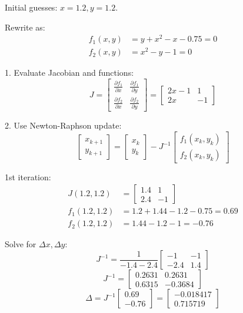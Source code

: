 \documentclass{article}
\begin{document}
Initial guesses: \( x = 1.2, y = 1.2 \).

Rewrite as:
\begin{align*}
f_1(x, y) &= y + x^2 - x - 0.75 = 0 \\
f_2(x, y) &= x^2 - y - 1 = 0
\end{align*}

1. Evaluate Jacobian and functions:
   \[
   J = \begin{bmatrix}
   \frac{\partial f_1}{\partial x} & \frac{\partial f_1}{\partial y} \\
   \frac{\partial f_2}{\partial x} & \frac{\partial f_2}{\partial y}
   \end{bmatrix}
   =
   \begin{bmatrix}
   2x - 1 & 1 \\
   2x & -1
   \end{bmatrix}
   \]

2. Use Newton-Raphson update:
   \[
   \begin{bmatrix} x_{k+1} \\ y_{k+1} \end{bmatrix} = \begin{bmatrix} x_k \\ y_k \end{bmatrix} - J^{-1} \begin{bmatrix} f_1(x_k, y_k) \\ f_2(x_k, y_k) \end{bmatrix}
   \]

1st iteration:
\begin{align*}
J(1.2, 1.2) &= \begin{bmatrix} 1.4 & 1 \\ 2.4 & -1 \end{bmatrix} \\
f_1(1.2, 1.2) &= 1.2 + 1.44 - 1.2 - 0.75 = 0.69 \\
f_2(1.2, 1.2) &= 1.44 - 1.2 - 1 = -0.76
\end{align*}

Solve for \( \Delta x, \Delta y \):
\[
J^{-1} = \frac{1}{-1.4 - 2.4} \begin{bmatrix} -1 & -1 \\ -2.4 & 1.4 \end{bmatrix}
\]
\[
J^{-1} = \begin{bmatrix} 0.2631 & 0.2631 \\ 0.6315 & -0.3684 \end{bmatrix}
\]
\[
\Delta = J^{-1} \begin{bmatrix} 0.69 \\ -0.76 \end{bmatrix} = \begin{bmatrix} -0.018417 \\ 0.715719 \end{bmatrix}
\]
\end{document}

